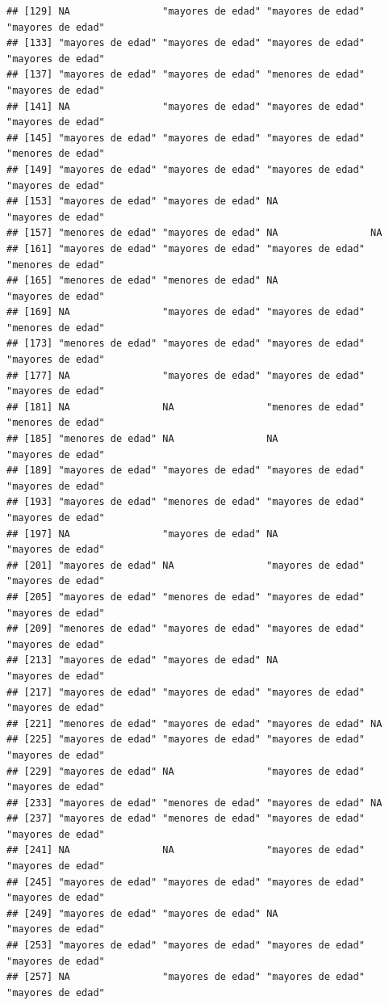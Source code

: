 \documentclass[11pt,]{book}
\begin{document}
\begin{verbatim}
## [129] NA                "mayores de edad" "mayores de edad" "mayores de edad"
## [133] "mayores de edad" "mayores de edad" "mayores de edad" "mayores de edad"
## [137] "mayores de edad" "mayores de edad" "menores de edad" "mayores de edad"
## [141] NA                "mayores de edad" "mayores de edad" "mayores de edad"
## [145] "mayores de edad" "mayores de edad" "mayores de edad" "menores de edad"
## [149] "mayores de edad" "mayores de edad" "mayores de edad" "mayores de edad"
## [153] "mayores de edad" "mayores de edad" NA                "mayores de edad"
## [157] "menores de edad" "mayores de edad" NA                NA               
## [161] "mayores de edad" "mayores de edad" "mayores de edad" "menores de edad"
## [165] "menores de edad" "menores de edad" NA                "mayores de edad"
## [169] NA                "mayores de edad" "mayores de edad" "menores de edad"
## [173] "menores de edad" "mayores de edad" "mayores de edad" "mayores de edad"
## [177] NA                "mayores de edad" "mayores de edad" "mayores de edad"
## [181] NA                NA                "menores de edad" "menores de edad"
## [185] "menores de edad" NA                NA                "mayores de edad"
## [189] "mayores de edad" "mayores de edad" "mayores de edad" "mayores de edad"
## [193] "mayores de edad" "menores de edad" "mayores de edad" "mayores de edad"
## [197] NA                "mayores de edad" NA                "mayores de edad"
## [201] "mayores de edad" NA                "mayores de edad" "mayores de edad"
## [205] "mayores de edad" "menores de edad" "mayores de edad" "mayores de edad"
## [209] "menores de edad" "mayores de edad" "mayores de edad" "mayores de edad"
## [213] "mayores de edad" "mayores de edad" NA                "mayores de edad"
## [217] "mayores de edad" "mayores de edad" "mayores de edad" "mayores de edad"
## [221] "menores de edad" "mayores de edad" "mayores de edad" NA               
## [225] "mayores de edad" "mayores de edad" "mayores de edad" "mayores de edad"
## [229] "mayores de edad" NA                "mayores de edad" "mayores de edad"
## [233] "mayores de edad" "menores de edad" "mayores de edad" NA               
## [237] "mayores de edad" "menores de edad" "mayores de edad" "mayores de edad"
## [241] NA                NA                "mayores de edad" "mayores de edad"
## [245] "mayores de edad" "mayores de edad" "mayores de edad" "mayores de edad"
## [249] "mayores de edad" "mayores de edad" NA                "mayores de edad"
## [253] "mayores de edad" "mayores de edad" "mayores de edad" "mayores de edad"
## [257] NA                "mayores de edad" "mayores de edad" "mayores de edad"

\end{verbatim}
\end{document}
